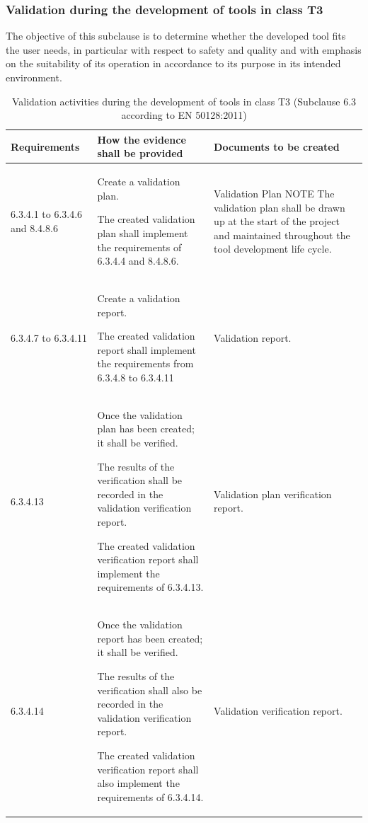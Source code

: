 \documentclass{template/openetcs_report}
\begin{document}
\subsubsection{Validation during the development of tools in class T3}
\begin{flushleft}
The objective of this subclause is to determine whether the developed tool fits the user needs, in particular with respect to safety and quality and with emphasis on the suitability of its operation in accordance to its purpose in its intended environment.
\end{flushleft}
{\footnotesize\sffamily\centering
\begin{longtable}{|p{2cm}|p{9cm}|p{3cm}|}
\caption{Validation activities during the development of tools in class T3 (Subclause 6.3 according to EN 50128:2011)}\\
\hline
\bfseries Requirements & \bfseries How the evidence shall be provided & \bfseries Documents to be created\\
\hline
\hline
\endhead
\hline
\endfoot

6.3.4.1 to 6.3.4.6 and 8.4.8.6 & Create a validation plan.

The created validation plan shall implement the requirements of 6.3.4.4 and 8.4.8.6.
& Validation Plan
\linebreak
\linebreak
NOTE\linebreak
The validation plan shall be drawn up at the start of the project and maintained throughout the tool development life cycle.\\ 
\hline
6.3.4.7 to 6.3.4.11 & Create a validation report.

The created validation report shall implement the requirements from 6.3.4.8 to 6.3.4.11
& Validation report.\\ 
\hline
6.3.4.13 & Once the validation plan has been created; it shall be verified.

The results of the verification shall be recorded in the validation verification report.

The created validation verification report shall implement the requirements of 6.3.4.13.
& Validation plan verification report.\\ 
\hline
6.3.4.14 & Once the validation report has been created; it shall be verified.

The results of the verification shall also be recorded in the validation verification report.

The created validation verification report shall also implement the requirements of 6.3.4.14.
& Validation verification report.\\ 
\hline
\end{longtable}}
\end{document}
